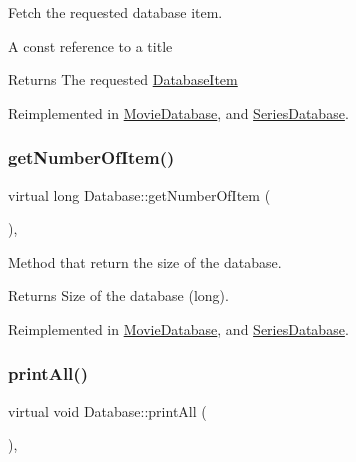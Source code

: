 Fetch the requested database item. 

A const reference to a title

\begin{DoxyReturn}{Returns}
The requested \hyperlink{classDatabaseItem}{Database\+Item}
\end{DoxyReturn}


Reimplemented in \hyperlink{classMovieDatabase_ac0bb39b8be599ffea76081809ae42dda}{Movie\+Database}, and \hyperlink{classSeriesDatabase_af5303a723910395b31f2e01088de9130}{Series\+Database}.

\mbox{\label{classDatabase_a230225cb341eb23a99a83ef3d1abae53}} 
\subsubsection{\texorpdfstring{get\+Number\+Of\+Item()}{getNumberOfItem()}}
{\footnotesize\ttfamily virtual long Database\+::get\+Number\+Of\+Item (\begin{DoxyParamCaption}{ }\end{DoxyParamCaption})\hspace{0.3cm}{\ttfamily [inline]}, {\ttfamily [virtual]}}



Method that return the size of the database. 

\begin{DoxyReturn}{Returns}
Size of the database (long).
\end{DoxyReturn}


Reimplemented in \hyperlink{classMovieDatabase_a9a386f51dd72d63414a124cbcfcd879b}{Movie\+Database}, and \hyperlink{classSeriesDatabase_af5fe5a423303eff4489a7679907ef994}{Series\+Database}.

\mbox{\label{classDatabase_afa345da530fd5c8dfe0c978917cd6049}} 
\subsubsection{\texorpdfstring{print\+All()}{printAll()}}
{\footnotesize\ttfamily virtual void Database\+::print\+All (\begin{DoxyParamCaption}{ }\end{DoxyParamCaption})\hspace{0.3cm}{\ttfamily [inline]}, {\ttfamily [virtual]}}



